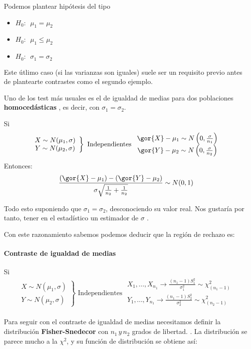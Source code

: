 \documentclass{apuntes}
\begin{document}
Podemos plantear hipótesis del tipo
\begin{itemize}
\item $H_0: \,\,\, \mu_1=\mu_2$
\item $H_0: \,\,\, \mu_1\leq\mu_2$
\item $H_0: \,\,\, \sigma_1 = \sigma_2$
\end{itemize}
Este útlimo caso (si las varianzas son iguales) suele ser un requisito previo antes de plantearte contrastes como el segundo ejemplo.


Uno de los test más usuales es el de igualdad de medias para dos poblaciones \textbf{homocedásticas} , es decir, con $\sigma_1=\sigma_2$.

Si \[\left.\begin{array}{cc}
X\sim N(\mu_1,\sigma)\\
Y\sim N(\mu_2,\sigma)
\end{array}\right\}\text{ Independientes } \begin{array}{cc}
\gor{X} -\mu_1 \sim N\left(0,\frac{\sigma}{n_1}\right)\\
\gor{Y} - \mu_2 \sim N\left(0,\frac{\sigma}{n_2}\right)
\end{array}\]
Entonces:
\[\frac{(\gor{X}-\mu_1) - (\gor{Y} - \mu_2)}{\sigma\sqrt{\frac{1}{n_2} + \frac{1}{n_2}}}\sim N(0,1)\]

Todo esto suponiendo que $\sigma_1=\sigma_2$, desconociendo su valor real. Nos gustaría por tanto, tener en el estadístico un estimador de $\sigma$ .

Con este razonamiento sabemos podemos deducir que la región de rechazo es:


\paragraph{Contraste de igualdad de medias}
Si \[\left.\begin{array}{cc}
X\sim N(\mu_1,\sigma)\\
Y\sim N(\mu_2,\sigma)
\end{array}\right\}\text{ Independientes } \begin{array}{c}
X_1,...,X_{n_1}\to \frac{(n_1-1)S_1^2}{\sigma_1^2} \sim \chi^2_{(n_1-1)}\\
Y_1,...,Y_{n_1}\to \frac{(n_1-1)S_2^2}{\sigma_2^2} \sim \chi^2_{(n_2-1)}\\
\end{array}\]

Para seguir con el contraste de igualdad de medias necesitamos definir la distribución \textbf{Fisher-Snedecor} con $n_1\,y\,n_2$ grados de libertad. . La distribución se parece mucho a la $\chi^2$, y su función de distribución se obtiene así:
\end{document}
